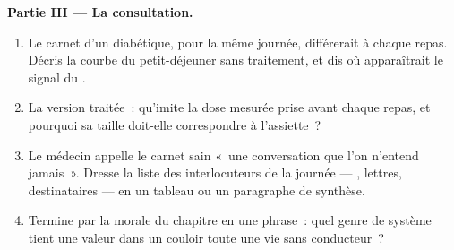 \begin{problem}
\medskip\noindent\textbf{Partie III --- La consultation.}
\begin{enumerate}[resume]
  \item Le carnet d'un diabétique, pour la même journée,
        différerait à chaque repas. Décris la courbe du
        petit-déjeuner sans traitement, et dis où
        apparaîtrait le signal du .
  \item La version traitée~: qu'imite la dose mesurée prise
        avant chaque repas, et pourquoi sa taille doit-elle
        correspondre à l'assiette~?
  \item Le médecin appelle le carnet sain «~une conversation
        que l'on n'entend jamais~». Dresse la liste des
        interlocuteurs de la journée --- , lettres,
        destinataires --- en un tableau ou un paragraphe de
        synthèse.
  \item Termine par la morale du chapitre en une phrase~:
        quel genre de système tient une valeur dans un
        couloir toute une vie sans conducteur~?
\end{enumerate}
\end{problem}
